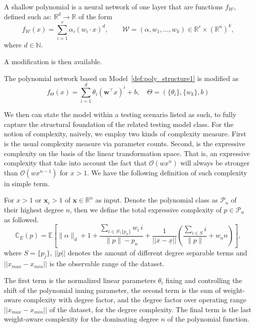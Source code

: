 \documentclass[10pt]{article} %
\begin{document}
\begin{definition}\label{def:poly_structure1}
    A shallow polynomial is a neural network of one layer that are functions $f_{\mathcal W}$, defined such as:
$\mathbb R^d \rightarrow \mathbb{R}$ of the form
\begin{equation}\label{eq:network_model} f_{\mathcal W}(x) = \sum_{i=1}^r
\alpha_{i} (w_i \cdot x)^d, \qquad \mathcal W = (\alpha,w_1,\ldots,w_k) \in
\mathbb{R}^r \times (\mathbb{R}^{n})^k,
\end{equation} 
where $d \in \mathbb{N}$.
\end{definition}
A modification is then available. 
\begin{definition}
    The polynomial network based on Model~\ref{def:poly_structure1} is modified as 
    \begin{equation}
        f_{\Theta}(x) = \sum_{i=1}^{d} \theta_i \left( \mathbf{w}^\top x \right)^i + b, \quad \Theta = (\{\theta_{i}\},\{w_{k}\},b)
    \end{equation}
\end{definition}
We then can state the model within a testing scenario listed as such, to fully capture the structural foundation of the related testing model class. For the notion of complexity, naively, we employ two kinds of complexity measure. First is the usual complexity measure via parameter counts. Second, is the expressive complexity on the basis of the linear transformation space. That is, an expressive complexity that take into account the fact that $\mathcal{O}(wx^{n})$ will always be stronger than $\mathcal{O}(wx^{n-1})$ for $x>1$. We have the following definition of such complexity in simple term. 

\begin{definition}
    For $x>1$ or $\mathbf{x}_{i}>1$ of $\mathbf{x}\in\mathbb{R}^{n}$ as input. Denote the polynomial class as $\mathcal{P}_{n}$ of their highest degree $n$, then we define the total expressive complexity of $p\in \mathcal{P}_{n}$ as followed.
    \begin{equation}
\mathbb{C}_{E}(p)
= \mathbb{E}\!\left[
\|\alpha\|_{d} + 1
+ \frac{\sum_{i\in S\setminus\{p_{n}\}} w_i\,i}{\|p\|-p_{n}}
+ \frac{1}{||\overline{x}-\underline{x}||}\!\left(
\frac{\sum_{i\in S} i}{\|p\|} + w_{n}n
\right)
\right],
\end{equation}
    where $S=\{p_{j}\}$, $||p||$ denotes the amount of different degree separable terms and $||x_{max}-x_{min}||$ is the observable range of the dataset. 
\end{definition}
The first term is the normalized linear parameters $\theta_{i}$ fixing and controlling the shift of the polynomial inning parameter, the second term is the sum of weight-aware complexity with degree factor, and the degree factor over operating range $||x_{max}-x_{min}||$ of the dataset, for the degree complexity. The final term is the last weight-aware complexity for the dominating degree $n$ of the polynomial function. 
\end{document}
